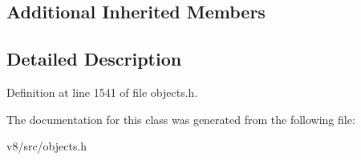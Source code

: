 \subsection*{Additional Inherited Members}


\subsection{Detailed Description}


Definition at line 1541 of file objects.\+h.



The documentation for this class was generated from the following file\+:\begin{DoxyCompactItemize}
\item 
v8/src/objects.\+h\end{DoxyCompactItemize}
